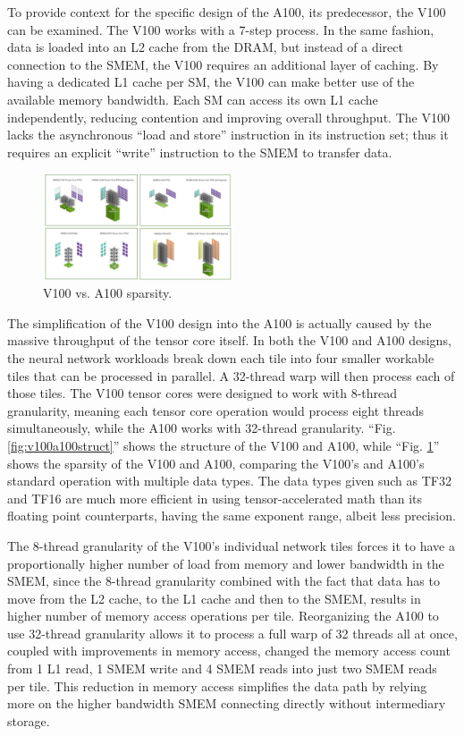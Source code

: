 To provide context for the specific design of the A100, its predecessor, the V100 can be examined.
The V100 works with a 7-step process.
In the same fashion, data is loaded into an L2 cache from the DRAM, but instead of a direct connection to the SMEM, the V100 requires an additional layer of caching.
By having a dedicated L1 cache per SM, the V100 can make better use of the available memory bandwidth.
Each SM can access its own L1 cache independently, reducing contention and improving overall throughput.
The V100 lacks the asynchronous ``load and store'' instruction in its instruction set; thus it requires an explicit ``write'' instruction to the SMEM to transfer data.

\begin{figure}[htbp!]
    \centerline{\includegraphics[width=0.5\textwidth]{images/gpu_sparsity}}
    \caption{V100 vs. A100 sparsity.}
    \label{fig:v100a100spars}
\end{figure}

The simplification of the V100 design into the A100 is actually caused by the massive throughput of the tensor core itself.
In both the V100 and A100 designs, the neural network workloads break down each tile into four smaller workable tiles that can be processed in parallel.
A 32-thread warp will then process each of those tiles.
The V100 tensor cores were designed to work with 8-thread granularity, meaning each tensor core operation would process eight threads simultaneously, while the A100 works with 32-thread granularity.
``Fig. \ref{fig:v100a100struct}'' shows the structure of the V100 and A100, while ``Fig. \ref{fig:v100a100spars}'' shows the sparsity of the V100 and A100, comparing the V100’s and A100’s standard operation with multiple data types.
The data types given such as TF32 and TF16 are much more efficient in using tensor-accelerated math than its floating point counterparts, having the same exponent range, albeit less precision.

The 8-thread granularity of the V100's individual network tiles forces it to have a proportionally higher number of load from memory and lower bandwidth in the SMEM, since the 8-thread granularity combined with the fact that data has to move from the L2 cache, to the L1 cache and then to the SMEM, results in higher number of memory access operations per tile.
Reorganizing the A100 to use 32-thread granularity allows it to process a full warp of 32 threads all at once, coupled with improvements in memory access, changed the memory access count from 1 L1 read, 1 SMEM write and 4 SMEM reads into just two SMEM reads per tile.
This reduction in memory access simplifies the data path by relying more on the higher bandwidth SMEM connecting directly without intermediary storage.

